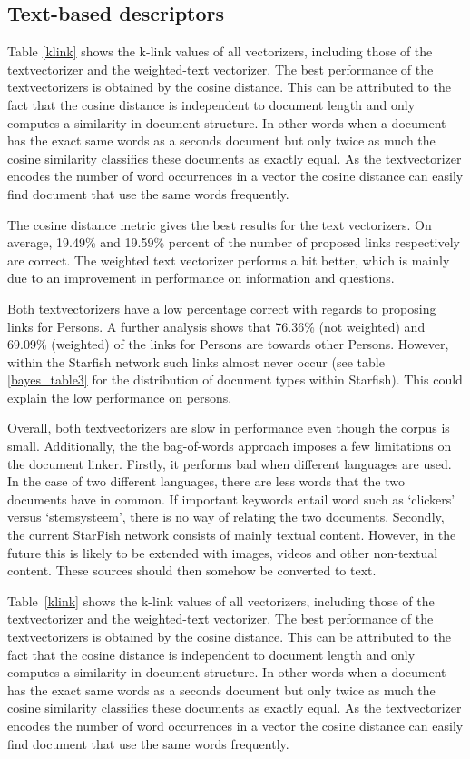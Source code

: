 \subsection{Text-based descriptors}
Table \ref{klink} shows the k-link values of all vectorizers, including those of the textvectorizer and the weighted-text vectorizer. The best performance of the textvectorizers is obtained by the cosine distance. This can be attributed
 to the fact that the cosine distance is independent to document length and only
 computes a similarity in document structure. In other words when a document
 has the exact same words as a seconds document but only twice as much the
 cosine similarity classifies these documents as exactly equal. As the textvectorizer
 encodes the number of word occurrences in a vector the cosine distance can 
 easily find document that use the same words frequently.

The cosine distance metric gives the best results for the text vectorizers. On average, 19.49\% and 19.59\% percent of the number of proposed links respectively are correct. The weighted text vectorizer performs a bit better, which is mainly due to an improvement in performance on information and questions.

Both textvectorizers have a low percentage correct with regards to proposing links for Persons. A further analysis shows that 76.36\% (not weighted) and 69.09\% (weighted) of the links for Persons are towards other Persons. However, within the Starfish network such links almost never occur (see table \ref{bayes_table3} for the distribution of document types within Starfish). This could explain the low performance on persons. 

Overall, both textvectorizers are slow in performance even though the corpus is small. Additionally, the the bag-of-words approach imposes a few limitations on the document linker. Firstly, it performs bad when different languages are used. In the case of two different languages, there are less words that the two documents have in common. If important keywords entail word such as `clickers' versus `stemsysteem', there is no way of relating the two documents. Secondly, the current StarFish network consists of mainly textual content. However, in the future this is likely to be extended with images, videos and other non-textual content. These sources should then somehow be converted to text.

Table~\ref{klink} shows the k-link values of all vectorizers, including those
of the textvectorizer and the weighted-text vectorizer. The best performance of
the textvectorizers is obtained by the cosine distance. This can be
attributed to the fact that the cosine distance is independent to document
length and only computes a similarity in document structure. In other words
when a document has the exact same words as a seconds document but only twice
as much the cosine similarity classifies these documents as exactly equal. As
the textvectorizer encodes the number of word occurrences in a vector the
cosine distance can  easily find document that use the same words frequently.

